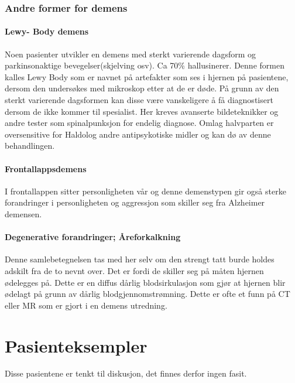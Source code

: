 				\subsubsection{Andre former for demens}
					\paragraph{Lewy- Body demens\\}\label{lewy-body}
						Noen pasienter utvikler en demens med sterkt varierende dagsform og parkinsonaktige bevegelser(skjelving osv). Ca 70\% hallusinerer. Denne formen kalles Lewy Body som er navnet på artefakter som ses i hjernen på pasientene, dersom den undersøkes med mikroskop etter at de er døde. På grunn av den sterkt varierende dagsformen kan disse være vanskeligere å få diagnostisert dersom de ikke kommer til spesialist. Her kreves avanserte bildeteknikker og andre tester som spinalpunksjon for endelig diagnose. Omlag halvparten er oversensitive for Haldol\textregistered og andre antipsykotiske midler og kan dø av denne behandlingen.
					\paragraph{Frontallappsdemens\\}
						I frontallappen sitter personligheten vår og denne demenstypen gir også sterke forandringer i personligheten og aggressjon som skiller seg fra Alzheimer demensen.
					\paragraph{Degenerative forandringer; Åreforkalkning\\}
						Denne samlebetegnelsen tas med her selv om den strengt tatt burde holdes adskilt fra de to nevnt over. Det er fordi de skiller seg på måten hjernen ødelegges på. Dette er en diffus dårlig blodsirkulasjon som gjør at hjernen blir ødelagt på grunn av dårlig blodgjennomstrømning. Dette er ofte et funn på CT eller MR som er gjort i en demens utredning.
		\section{Pasienteksempler}
			Disse pasientene er tenkt til diskusjon, det finnes derfor ingen fasit. 
